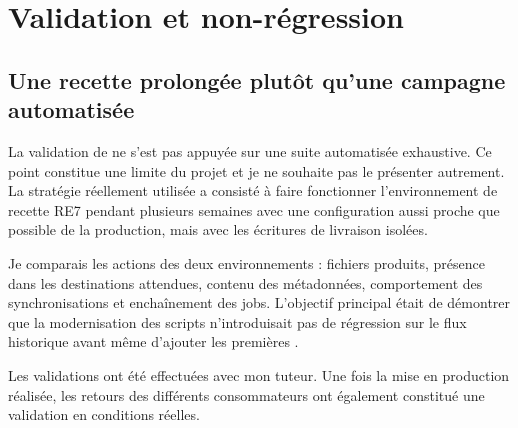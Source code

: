 \section{Validation et non-régression}

\subsection{Une recette prolongée plutôt qu'une campagne automatisée}

La validation de  ne s'est pas appuyée sur une suite automatisée exhaustive. Ce point constitue une limite du projet et je ne souhaite pas le présenter autrement. La stratégie réellement utilisée a consisté à faire fonctionner l'environnement de recette RE7 pendant plusieurs semaines avec une configuration aussi proche que possible de la production, mais avec les écritures de livraison isolées.

Je comparais les actions des deux environnements : fichiers produits, présence dans les destinations attendues, contenu des métadonnées, comportement des synchronisations et enchaînement des jobs. L'objectif principal était de démontrer que la modernisation des scripts n'introduisait pas de régression sur le flux historique avant même d'ajouter les premières .

Les validations ont été effectuées avec mon tuteur. Une fois la mise en production réalisée, les retours des différents consommateurs ont également constitué une validation en conditions réelles.

